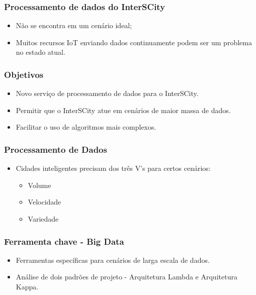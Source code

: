 \documentclass{beamer}
\begin{document}
    \begin{frame}
        \frametitle{Processamento de dados do InterSCity}
        \begin{itemize}
            \item<2-> Não se encontra em um cenário ideal;
            \item<3-> Muitos recursos IoT enviando dados continuamente podem ser um
                problema no estado atual.
        \end{itemize}
    \end{frame}

    \begin{frame}
        \frametitle{Objetivos}
        \begin{itemize}
            \item Novo serviço de processamento de dados para o InterSCity.
            \item Permitir que o InterSCity atue em cenários de maior massa de dados.
            \item Facilitar o uso de algoritmos mais complexos.
        \end{itemize}
    \end{frame}

    \begin{frame}
        \frametitle{Processamento de Dados}
        \begin{itemize}
            \item Cidades inteligentes precisam dos três V's para certos cenários:
                \begin{itemize}
                    \item Volume
                    \item Velocidade
                    \item Variedade
                \end{itemize}
        \end{itemize}
    \end{frame}

    \begin{frame}
        \frametitle{Ferramenta chave - Big Data}
        \begin{itemize}
            \item Ferramentas específicas para cenários de larga escala de dados.
            \item Análise de dois padrões de projeto - Arquitetura Lambda e Arquitetura Kappa.
        \end{itemize}
    \end{frame}
\end{document}
